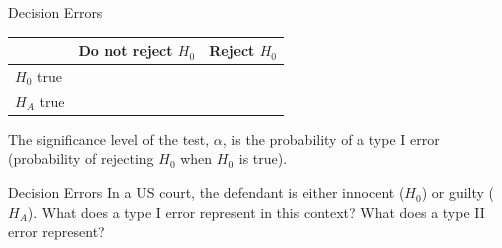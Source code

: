 \documentclass[fleqn, 11pt]{beamer}
\begin{document}
\begin{frame}{Decision Errors}
\begin{table}[ht]
\begin{tabular}{p{3cm}|p{3cm}|p{3cm}}
 & Do not reject $H_0$ &  Reject $H_0$\\
\hline
$H_0$ true \newline &  & \\
\hline
$H_A$ true \newline  &  &\\ 
\end{tabular}
\end{table}

\vspace{20pt}
The significance level of the test, $\alpha$, is the probability of a type I error (probability of rejecting $H_0$ when $H_0$ is true).
\end{frame}

\begin{frame}{Decision Errors}
\vspace{-3cm}
In a US court, the defendant is either innocent ($H_0$) or guilty ($H_A$).  What does a type I error represent in this context?  What does a type II error represent?\\

\end{frame}
\end{document}
